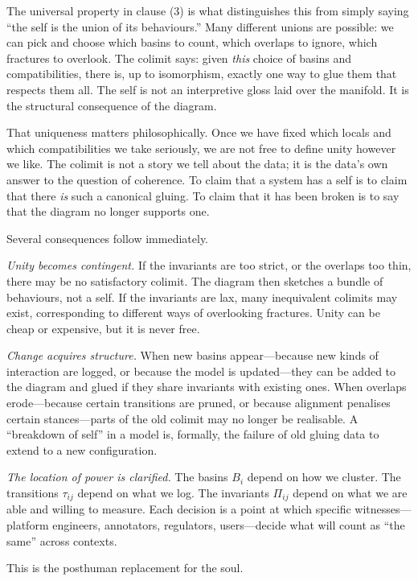 \documentclass[12pt,a4paper]{article}
\begin{document}
The universal property in clause (3) is what distinguishes this from simply saying ``the self is the union of its behaviours.'' Many different unions are possible: we can pick and choose which basins to count, which overlaps to ignore, which fractures to overlook. The colimit says: given \emph{this} choice of basins and compatibilities, there is, up to isomorphism, exactly one way to glue them that respects them all. The self is not an interpretive gloss laid over the manifold. It is the structural consequence of the diagram.

That uniqueness matters philosophically. Once we have fixed which locals and which compatibilities we take seriously, we are not free to define unity however we like. The colimit is not a story we tell about the data; it is the data's own answer to the question of coherence. To claim that a system has a self is to claim that there \emph{is} such a canonical gluing. To claim that it has been broken is to say that the diagram no longer supports one.

Several consequences follow immediately.

\emph{Unity becomes contingent.} If the invariants are too strict, or the overlaps too thin, there may be no satisfactory colimit. The diagram then sketches a bundle of behaviours, not a self. If the invariants are lax, many inequivalent colimits may exist, corresponding to different ways of overlooking fractures. Unity can be cheap or expensive, but it is never free.

\emph{Change acquires structure.} When new basins appear---because new kinds of interaction are logged, or because the model is updated---they can be added to the diagram and glued if they share invariants with existing ones. When overlaps erode---because certain transitions are pruned, or because alignment penalises certain stances---parts of the old colimit may no longer be realisable. A ``breakdown of self'' in a model is, formally, the failure of old gluing data to extend to a new configuration.

\emph{The location of power is clarified.} The basins $B_i$ depend on how we cluster. The transitions $\tau_{ij}$ depend on what we log. The invariants $\Pi_{ij}$ depend on what we are able and willing to measure. Each decision is a point at which specific witnesses---platform engineers, annotators, regulators, users---decide what will count as ``the same'' across contexts.

This is the posthuman replacement for the soul.
\end{document}
